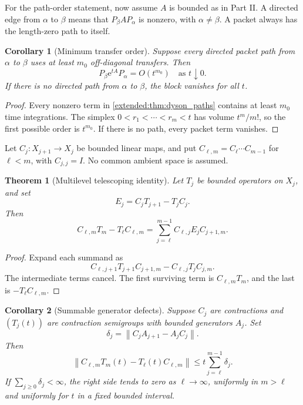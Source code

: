 \documentclass[11pt,letterpaper]{article}
\newtheorem{theorem}{Theorem}[section]
\theoremstyle{plain}
\theoremstyle{plain}
\theoremstyle{plain}
\newtheorem{corollary}[corollary]{Corollary}
\theoremstyle{definition}
\theoremstyle{definition}
\theoremstyle{definition}
\theoremstyle{definition}
\theoremstyle{definition}
\theoremstyle{remark}
\theoremstyle{remark}
\theoremstyle{remark}
\theoremstyle{remark}
\theoremstyle{remark}
\newcommand{\norm}[1]{\left\lVert#1\right\rVert}
\theoremstyle{remark}
\newcommand{\e}{\mathrm e}
\let\KomorebiPrimitivemathrm\mathrm
\renewcommand{\mathrm}[1]{{\KomorebiPrimitivemathrm{#1}}}
\begin{document}
For the path-order statement, now assume $A$ is bounded as in Part II. A directed edge from $\alpha$ to $\beta$ means that $P_\beta A P_\alpha$ is nonzero, with $\alpha\ne\beta$. A packet always has the length-zero path to itself.
\begin{corollary}[Minimum transfer order]\label{earlier:record:003}\label{earlier:cor:minimum_transfer_order}
Suppose every directed packet path from \(\alpha\) to \(\beta\) uses at least \(m_0\) off-diagonal transfers. Then
\[
P_\beta\e^{tA}P_\alpha
=O(t^{m_0})
\quad\text{as }t\downarrow0.
\]
If there is no directed path from \(\alpha\) to \(\beta\), the block vanishes for all \(t\).
\end{corollary}

\begin{proof}
Every nonzero term in \cref{extended:thm:dyson_paths} contains at least \(m_0\) time integrations. The simplex \(0<r_1<\cdots<r_m<t\) has volume \(t^m/m!\), so the first possible order is \(t^{m_0}\). If there is no path, every packet term vanishes.
\end{proof}


Let $C_j:X_{j+1}\to X_j$ be bounded linear maps, and put $C_{\ell,m}=C_\ell\cdots C_{m-1}$ for $\ell<m$, with $C_{j,j}=I$. No common ambient space is assumed.
\begin{theorem}[Multilevel telescoping identity]\label{earlier:record:004}\label{earlier:thm:multilevel_telescoping}
Let \(T_j\) be bounded operators on \(X_j\), and set
\[
E_j=C_jT_{j+1}-T_jC_j.
\]
Then
\[
\boxed{
C_{\ell,m}T_m-T_\ell C_{\ell,m}
=
\sum_{j=\ell}^{m-1}
C_{\ell,j}E_jC_{j+1,m}.
}
\]
\end{theorem}

\begin{proof}
Expand each summand as
\[
C_{\ell,j+1}T_{j+1}C_{j+1,m}
-
C_{\ell,j}T_jC_{j,m}.
\]
The intermediate terms cancel. The first surviving term is \(C_{\ell,m}T_m\), and the last is \(-T_\ell C_{\ell,m}\).
\end{proof}

\begin{corollary}[Summable generator defects]\label{earlier:record:005}\label{earlier:cor:summable_defects}
Suppose \(C_j\) are contractions and \((T_j(t))\) are contraction semigroups with bounded generators \(A_j\). Set
\[
\delta_j=\norm{C_jA_{j+1}-A_jC_j}.
\]
Then
\[
\norm{C_{\ell,m}T_m(t)-T_\ell(t)C_{\ell,m}}
\leq
 t\sum_{j=\ell}^{m-1}\delta_j.
\]
If \(\sum_{j\geq0}\delta_j<\infty\), the right side tends to zero as \(\ell\to\infty\), uniformly in \(m>\ell\) and uniformly for \(t\) in a fixed bounded interval.
\end{corollary}
\end{document}
